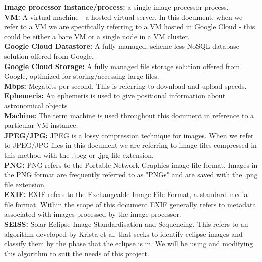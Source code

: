 \documentclass[10pt, onecolumn, draftclsnofoot, letterpaper, compsoc]{IEEEtran}
\begin{document}
\noindent \textbf{Image processor instance/process:} a single image processor
process. \\

\noindent \textbf{VM:}  A virtual machine - a hosted virtual server. In this
document, when we refer to a VM we are specifically referring to a VM hosted in
Google Cloud - this could be either a bare VM or a single node in a VM cluster.\\

\noindent \textbf{Google Cloud Datastore:} A fully managed, scheme-less NoSQL
database solution offered from Google.\\

\noindent \textbf{Google Cloud Storage:}  A fully managed file storage solution
offered from Google, optimized for storing/accessing large files.\\

\noindent \textbf{Mbps:} Megabits per second. This is referring to download and
upload speeds.\\

\noindent \textbf{Ephemeris:} An ephemeris is used to give positional information
about astronomical objects\\

\noindent \textbf{Machine:} The term machine is used throughout this document in
reference to a particular VM instance.\\

\noindent \textbf{JPEG/JPG:}
JPEG is a lossy compression technique for images. When we refer
to JPEG/JPG files in this document we are referring to image files 
compressed in this method with the .jpeg or .jpg file extension. \\

\noindent \textbf{PNG:}
PNG refers to the Portable Network Graphics image file format. 
Images in the PNG format are frequently referred to as "PNGs" and are 
saved with the .png file extension. \\

\noindent \textbf{EXIF:} EXIF refers to the Exchangeable Image File Format, a
standard  media file format. Within the scope of this document EXIF generally
refers to metadata associated with images processed by the image processor. \\

\noindent \textbf{SEISS:} Solar Eclipse Image Standardisation and Sequencing.
This refers to an algorithm developed by Krista et al. \cite{imgKrista} that
seeks to identify eclipse images and classify them by the phase that the
eclipse is in. We will be using and modifying this algorithm to suit the needs
of this project. \\



\end{document}

